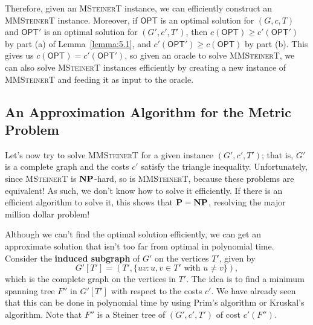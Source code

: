 Therefore, given an \textsc{MSteinerT} instance, we can efficiently construct 
an \textsc{MMSteinerT} instance. Moreover, if $\textsf{OPT}$ is an optimal solution for 
$(G, c, T)$ and $\textsf{OPT}'$ is an optimal solution for $(G', c', T')$, 
then $c(\textsf{OPT}) \geq c'(\textsf{OPT}')$ by part (a) of Lemma~\ref{lemma:5.1},
and $c'(\textsf{OPT}') \geq c(\textsf{OPT})$ by part (b). This gives us 
$c(\textsf{OPT}) = c'(\textsf{OPT}')$,
so given an oracle to solve \textsc{MMSteinerT}, we can also solve 
\textsc{MSteinerT} instances efficiently by creating a new instance 
of \textsc{MMSteinerT} and feeding it as input to the oracle.

\subsection{An Approximation Algorithm for the Metric Problem} \label{subsec:5.3}
Let's now try to solve \textsc{MMSteinerT} for a given instance $(G', c', T')$;
that is, $G'$ is a complete graph and the costs $c'$ satisfy the triangle 
inequality. Unfortunately, since \textsc{MSteinerT} is $\mathbf{NP}$-hard, so is 
\textsc{MMSteinerT}, because these problems are equivalent! As such, we don't 
know how to solve it efficiently. If there is an efficient algorithm to solve it, this 
shows that $\mathbf{P} = \mathbf{NP}$, resolving the major million dollar problem!

Although we can't find the optimal solution efficiently, we can get an 
approximate solution that isn't too far from optimal in polynomial time. 
Consider the {\bf induced subgraph} of $G'$ on the vertices $T'$, given by 
\[ G'[T'] = (T', \{uv : u, v \in T' \text{ with } u\neq v\}), \] 
which is the complete graph on the vertices in $T'$. The idea is to find a 
minimum spanning tree $F''$ in $G'[T']$ with respect to the costs $c'$. 
We have already seen that this can be done in polynomial time by using 
Prim's algorithm or Kruskal's algorithm. Note that $F''$ is a Steiner 
tree of $(G', c', T')$ of cost $c'(F'')$. 

